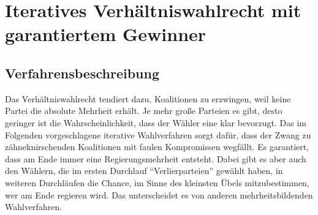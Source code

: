 \clearpage
\section{Iteratives Verhältniswahlrecht mit garantiertem Gewinner}

\subsection{Verfahrensbeschreibung}

Das Verhältniswahlrecht tendiert dazu, Koalitionen zu erzwingen, weil keine Partei die absolute
Mehrheit erhält. Je mehr große Parteien es gibt, desto geringer ist die Wahrscheinlichkeit, dass
der Wähler eine klar bevorzugt. Das im Folgenden vorgeschlagene iterative Wahlverfahren sorgt
dafür, dass der Zwang zu zähneknirschenden Koalitionen mit faulen Kompromissen wegfällt. Es
garantiert, dass am Ende immer eine Regierungsmehrheit entsteht. Dabei gibt es aber auch den
Wählern, die im ersten Durchlauf \enquote{Verlierparteien} gewählt haben, in weiteren Durchläufen
die Chance, im Sinne des kleinsten Übels mitzubestimmen, wer am Ende regieren wird. Das
unterscheidet es von anderen mehrheitsbildenden Wahlverfahren.

